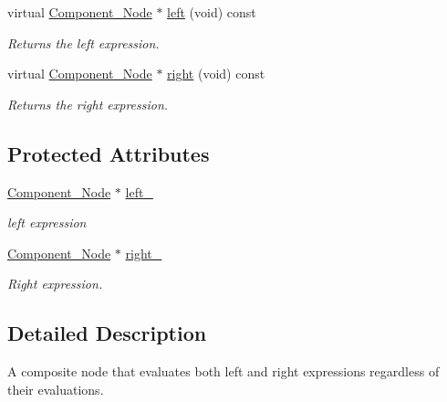 \begin{DoxyCompactItemize}
virtual \hyperlink{classMadara_1_1Expression__Tree_1_1Component__Node}{Component\_\-Node} $\ast$ \hyperlink{classMadara_1_1Expression__Tree_1_1Composite__Binary__Node_a6ca5cccbc46ccc6026c18f9665298380}{left} (void) const 
\begin{DoxyCompactList}\small\item\em Returns the left expression. \item\end{DoxyCompactList}\item 
virtual \hyperlink{classMadara_1_1Expression__Tree_1_1Component__Node}{Component\_\-Node} $\ast$ \hyperlink{classMadara_1_1Expression__Tree_1_1Composite__Unary__Node_ade55cde5707e0fa73ab1c019159b9aec}{right} (void) const 
\begin{DoxyCompactList}\small\item\em Returns the right expression. \item\end{DoxyCompactList}\end{DoxyCompactItemize}
\subsection*{Protected Attributes}
\begin{DoxyCompactItemize}
\item 
\hyperlink{classMadara_1_1Expression__Tree_1_1Component__Node}{Component\_\-Node} $\ast$ \hyperlink{classMadara_1_1Expression__Tree_1_1Composite__Binary__Node_acac60a70beb2484737e6e7161edb2d1b}{left\_\-}
\begin{DoxyCompactList}\small\item\em left expression \item\end{DoxyCompactList}\item 
\hyperlink{classMadara_1_1Expression__Tree_1_1Component__Node}{Component\_\-Node} $\ast$ \hyperlink{classMadara_1_1Expression__Tree_1_1Composite__Unary__Node_a077b7bd1b52df6f5c6adfde735556a68}{right\_\-}
\begin{DoxyCompactList}\small\item\em Right expression. \item\end{DoxyCompactList}\end{DoxyCompactItemize}


\subsection{Detailed Description}
A composite node that evaluates both left and right expressions regardless of their evaluations. 

